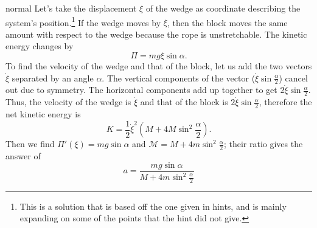 \begin{solution}{normal}
Let’s take the displacement $\xi$ of the wedge as coordinate describing the system’s position.\footnote{This is a solution that is based off the one given in hints, and is mainly expanding on some of the points that the hint did not give.} If the wedge moves by $\xi$, then the block moves the same amount with respect to the wedge because the rope is unstretchable. The kinetic energy changes by\[\Pi = mg\xi\sin\alpha.\]To find the velocity of the wedge and that of the block, let us add the two vectors $\dot\xi$ separated by an angle $\alpha$. The vertical components of the vector ($\dot\xi\sin\frac{\alpha}{2}$) cancel out due to symmetry. The horizontal components add up together to get $2\dot{\xi}\sin \frac{\alpha}{2}$. Thus, the velocity of the wedge is $\dot{\xi}$ and that of the block is $2\dot{\xi}\sin \frac{\alpha}{2}$, therefore the net kinetic energy is\[K=\frac{1}{2}\dot{\xi}^2\left(M+4M\sin^2 \frac{\alpha}{2}\right).\]Then we find $\Pi'(\xi) = mg \sin\alpha$ and $\mathcal{M} = M + 4m\sin^2\frac{\alpha}{2}$; their ratio gives the answer of
\[\boxed{a=\frac{mg \sin\alpha}{M + 4m\sin^2\frac{\alpha}{2}}}\]

\end{solution}
